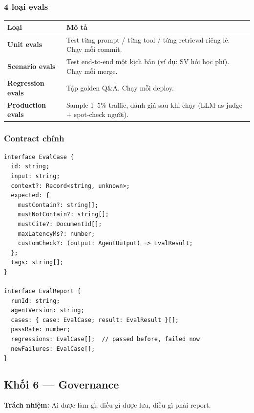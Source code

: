 \documentclass[11pt,a4paper]{article}
\begin{document}
\subsubsection*{4 loại evals}

\begin{tabularx}{\linewidth}{@{}p{3.3cm} X@{}}
\toprule
\textbf{Loại} & \textbf{Mô tả} \\
\midrule
\textbf{Unit evals} & Test từng prompt / từng tool / từng retrieval riêng lẻ. Chạy mỗi commit. \\
\textbf{Scenario evals} & Test end-to-end một kịch bản (ví dụ: SV hỏi học phí). Chạy mỗi merge. \\
\textbf{Regression evals} & Tập golden Q\&A. Chạy mỗi deploy. \\
\textbf{Production evals} & Sample 1--5\% traffic, đánh giá sau khi chạy (LLM-as-judge + spot-check người). \\
\bottomrule
\end{tabularx}

\subsubsection*{Contract chính}

\begin{lstlisting}
interface EvalCase {
  id: string;
  input: string;
  context?: Record<string, unknown>;
  expected: {
    mustContain?: string[];
    mustNotContain?: string[];
    mustCite?: DocumentId[];
    maxLatencyMs?: number;
    customCheck?: (output: AgentOutput) => EvalResult;
  };
  tags: string[];
}

interface EvalReport {
  runId: string;
  agentVersion: string;
  cases: { case: EvalCase; result: EvalResult }[];
  passRate: number;
  regressions: EvalCase[];  // passed before, failed now
  newFailures: EvalCase[];
}
\end{lstlisting}

\subsection{Khối 6 — Governance}

\textbf{Trách nhiệm:} Ai được làm gì, điều gì được lưu, điều gì phải report.
\end{document}
